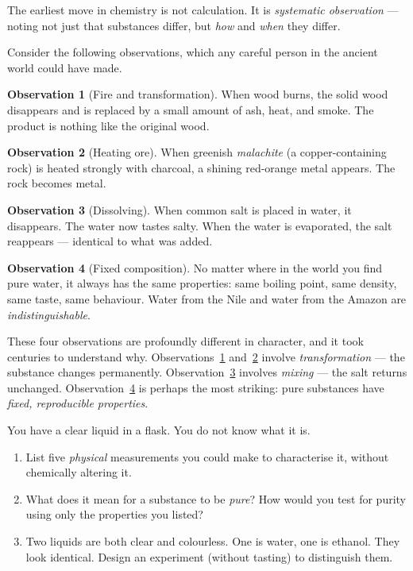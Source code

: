 \documentclass[12pt, a4paper]{book}
\theoremstyle{definition}
\newtheorem{observation}{Observation}[chapter]
\newcommand{\newterm}[1]{\textit{\textcolor{DiscoveryColor}{#1}}}
\begin{document}
The earliest move in chemistry is not calculation.
It is \newterm{systematic observation} — noting not just that
substances differ, but \emph{how} and \emph{when} they differ.

Consider the following observations, which any careful person
in the ancient world could have made.

\begin{observation}[Fire and transformation]
When wood burns, the solid wood disappears and is replaced by
a small amount of ash, heat, and smoke.
The product is nothing like the original wood.
\label{obs:burning}
\end{observation}

\begin{observation}[Heating ore]
When greenish \emph{malachite} (a copper-containing rock)
is heated strongly with charcoal,
a shining red-orange metal appears.
The rock becomes metal.
\label{obs:ore}
\end{observation}

\begin{observation}[Dissolving]
When common salt is placed in water, it disappears.
The water now tastes salty.
When the water is evaporated, the salt reappears —
identical to what was added.
\label{obs:dissolving}
\end{observation}

\begin{observation}[Fixed composition]
No matter where in the world you find pure water,
it always has the same properties: same boiling point,
same density, same taste, same behaviour.
Water from the Nile and water from the Amazon are \emph{indistinguishable}.
\label{obs:fixedcomp}
\end{observation}

\vspace{0.5em}

These four observations are profoundly different in character,
and it took centuries to understand why.
Observations~\ref{obs:burning} and~\ref{obs:ore} involve
\emph{transformation} — the substance changes permanently.
Observation~\ref{obs:dissolving} involves \emph{mixing} —
the salt returns unchanged.
Observation~\ref{obs:fixedcomp} is perhaps the most striking:
pure substances have \emph{fixed, reproducible properties}.

\begin{puzzlebox}
You have a clear liquid in a flask.
You do not know what it is.

\begin{enumerate}[leftmargin=*, label=(\alph*)]
  \item List five \emph{physical} measurements you could make to
        characterise it, without chemically altering it.
  \item What does it mean for a substance to be \emph{pure}?
        How would you test for purity using only the properties
        you listed?
  \item Two liquids are both clear and colourless.
        One is water, one is ethanol.
        They look identical.
        Design an experiment (without tasting) to distinguish them.
\end{enumerate}
\end{puzzlebox}
\end{document}
